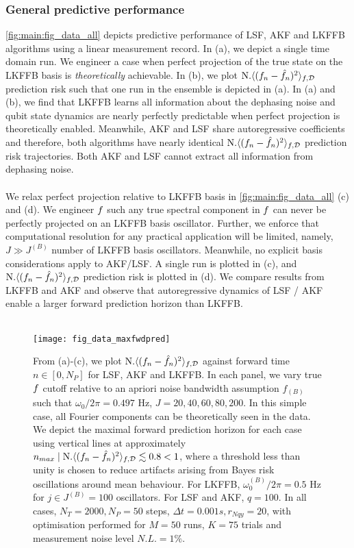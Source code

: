 \subsubsection{General predictive performance}

\cref{fig:main:fig_data_all} depicts predictive performance of LSF, AKF and LKFFB algorithms using a linear measurement record. In (a), we depict a single time domain run. We engineer a case when perfect projection of the true state on the LKFFB basis is \textit{theoretically} achievable. In (b), we plot $\text{N.} \langle (f_n - \hat{f}_n)^2 \rangle_{f, \mathcal{D}}$ prediction risk such that one run in the ensemble is depicted in (a).  In (a) and (b), we find that LKFFB learns all information about the dephasing noise and qubit state dynamics are nearly perfectly predictable when perfect projection is theoretically enabled. Meanwhile, AKF and LSF share autoregressive coefficients and therefore, both algorithms have nearly identical $\text{N.} \langle (f_n - \hat{f}_n)^2 \rangle_{f, \mathcal{D}}$ prediction risk trajectories. Both AKF and LSF cannot extract all information from dephasing noise.
\\
\\
We relax perfect projection relative to LKFFB basis in \cref{fig:main:fig_data_all}  (c) and (d). We engineer $f$ such any true spectral component in $f$ can never be perfectly projected on an LKFFB basis oscillator. Further, we enforce that  computational resolution for any practical application will be limited, namely, $J \gg J^{(B)}$ number of LKFFB basis oscillators. Meanwhile, no explicit basis considerations apply to AKF/LSF. A single run is plotted in (c), and $\text{N.} \langle (f_n - \hat{f}_n)^2 \rangle_{f, \mathcal{D}}$ prediction risk is plotted in (d). We compare results from LKFFB and AKF and observe that autoregressive dynamics of LSF / AKF enable a larger forward prediction horizon than LKFFB. 
\\
\\
\begin{figure}
    \texttt{[image: fig\_data\_maxfwdpred]}
    \caption{\label{fig:main:fig_data_maxfwdpred} From (a)-(c), we plot $\text{N.} \langle (f_n - \hat{f}_n)^2 \rangle_{f, \mathcal{D}}$ against forward time $n \in [0, N_P]$ for LSF, AKF and LKFFB. In each panel, we vary true $f$ cutoff relative to an apriori noise bandwidth assumption $f_{(B)}$ such that $\omega_0 / 2\pi = 0.497$ Hz, $J = 20, 40, 60, 80, 200$. In this simple case, all Fourier components can be theoretically seen in the data. We depict the maximal forward prediction horizon for each case using vertical lines at approximately $ n_{max} \mid  \text{N.} \langle (f_n - \hat{f}_n)^2 \rangle_{f, \mathcal{D}} \lesssim 0.8 < 1$, where a threshold less than unity is chosen to reduce artifacts arising from Bayes risk oscillations around mean behaviour. For LKFFB, $\omega_0^{(B)} / 2\pi = 0.5$ Hz for $j \in J^{(B)} = 100$ oscillators. For LSF and AKF, $q = 100$. In all cases,  $N_T = 2000, N_P = 50$ steps, $\Delta t = 0.001s, r_{Nqy}=20$, with optimisation performed for $M=50$ runs, $K=75$ trials and measurement noise level $N.L. = 1\%$. } 
\end{figure} 
